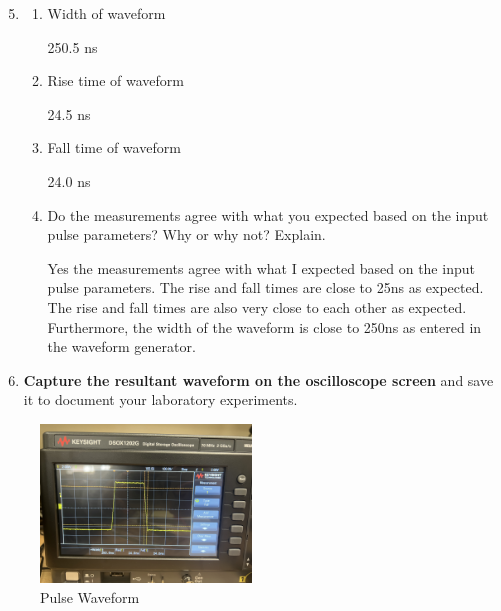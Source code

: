 \documentclass[12pt]{article}
\begin{document}
\begin{enumerate}
\setcounter{enumi}{4}
\item
\begin{enumerate}
    
\item Width of waveform

250.5 ns

\item Rise time of waveform

24.5 ns

\item Fall time of waveform

24.0 ns

\item Do the measurements agree with what you expected based on the input pulse parameters? Why or why not? Explain.

Yes the measurements agree with what I expected based on the input pulse parameters. 
The rise and fall times are close to 25ns as expected. 
The rise and fall times are also very close to each other as expected.
Furthermore, the width of the waveform is close to 250ns as entered in the waveform generator.

\end{enumerate}

\item \textbf{Capture the resultant waveform on the oscilloscope screen} and save it to document your laboratory experiments.
\end{enumerate}
\begin{figure}[h]
    \centering
    \includegraphics[width=0.5\textwidth]{PulseWaveform.jpeg}
    \caption{Pulse Waveform}
    \label{fig:Pulse-Waveform}
\end{figure}
\end{document}
